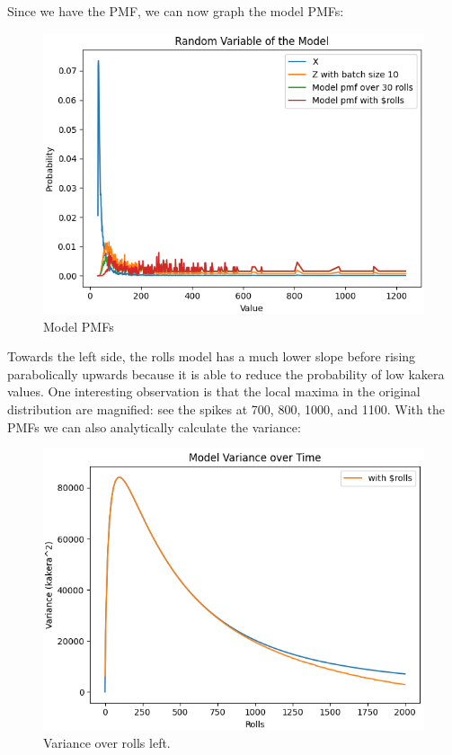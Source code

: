 \documentclass[11pt, oneside]{article}
\theoremstyle{plain}
\theoremstyle{definition}
\begin{document}
Since we have the PMF, we can now graph the model PMFs:
\begin{figure}[h!]
  \centering
  \includegraphics[scale=0.7]{graphs/random_variables/model_rolls.png}
  \caption{Model PMFs}
\end{figure}
Towards the left side, the rolls model has a much lower slope before rising
parabolically upwards because it is able to reduce the probability of low
kakera values. One interesting observation is that the local maxima in the
original distribution are magnified: see the spikes at 700, 800, 1000, and
1100. With the PMFs we can also analytically calculate the variance:
\begin{figure}[h!]
  \centering
  \includegraphics[scale=0.6]{graphs/variance/model_rolls.png}
  \caption{Variance over rolls left.}
\end{figure}
\end{document}

